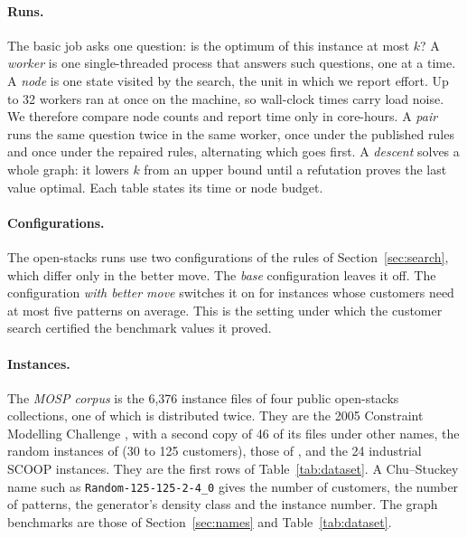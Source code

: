 \paragraph{Runs.} The basic job asks one question: is the optimum of this
instance at most $k$? A \emph{worker} is one single-threaded process that
answers such questions, one at a time. A \emph{node} is one state visited by
the search, the unit in which we report effort. Up to 32 workers ran at
once on the machine, so wall-clock times carry load noise. We therefore
compare node counts and report time only in core-hours. A \emph{pair} runs
the same question twice in the same worker, once under the published rules
and once under the repaired rules, alternating which goes first. A
\emph{descent} solves a whole graph: it lowers $k$ from an upper bound until a
refutation proves the last value optimal. Each table states its time or node
budget.

\paragraph{Configurations.} The open-stacks runs use two configurations of the
rules of Section~\ref{sec:search}, which differ only in the better move. The
\emph{base} configuration leaves it off. The configuration \emph{with better
move} switches it on for instances whose customers need at most five patterns on
average. This is the setting under which the customer search certified the
benchmark values it proved.

\paragraph{Instances.} The \emph{MOSP corpus} is the 6,376 instance files of
four public open-stacks collections, one of which is distributed twice. They
are the 2005 Constraint Modelling Challenge \citep{SmithGent2005}, with a
second copy of 46 of its files under other names, the random
instances of \citet{ChuStuckey2009} (30 to 125 customers), those of
\citet{FaggioliBentivoglio1998}, and the 24 industrial SCOOP instances. They
are the first rows of Table~\ref{tab:dataset}. A Chu--Stuckey name such as
\texttt{Random-125-125-2-4\_0} gives the number of customers, the number of
patterns, the generator's density class and the instance number. The graph
benchmarks are those of Section~\ref{sec:names} and Table~\ref{tab:dataset}.

